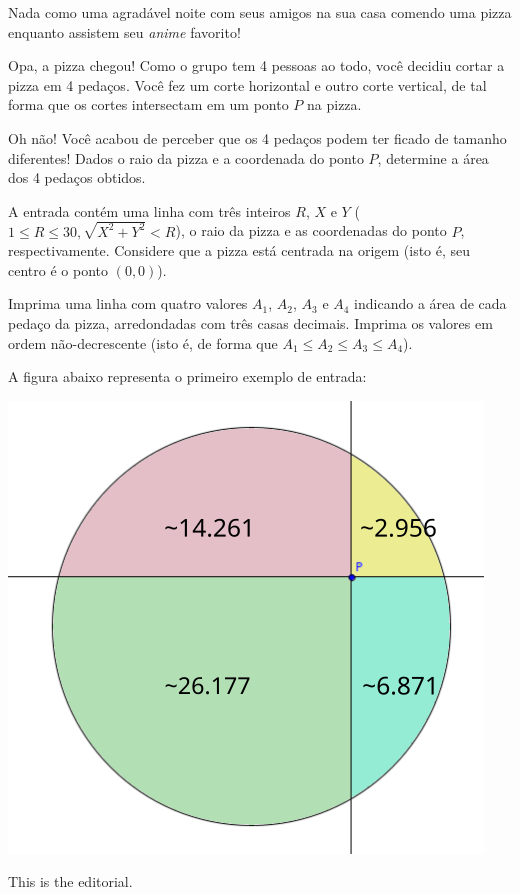 Nada como uma agradável noite com seus amigos na sua casa comendo uma pizza
enquanto assistem seu \textit{anime} favorito!

Opa, a pizza chegou! Como o grupo tem 4 pessoas ao todo, você decidiu cortar a
pizza em 4 pedaços. Você fez um corte horizontal e outro corte vertical, de tal
forma que os cortes intersectam em um ponto $P$ na pizza.

Oh não! Você acabou de perceber que os 4 pedaços podem ter ficado de tamanho
diferentes! Dados o raio da pizza e a coordenada do ponto $P$, determine a área
dos 4 pedaços obtidos.


A entrada contém uma linha com três inteiros $R$, $X$ e $Y$
($1 \leq R \leq 30, \sqrt{X^2 + Y^2} < R$), o raio da pizza e as coordenadas do ponto
$P$, respectivamente. Considere que a pizza está centrada na origem (isto é, seu
centro é o ponto $(0,0)$).


Imprima uma linha com quatro valores $A_1$, $A_2$, $A_3$ e $A_4$ indicando a área de cada
pedaço da pizza, arredondadas com três casas decimais. Imprima os valores em
ordem não-decrescente (isto é, de forma que $A_1 \leq A_2 \leq A_3 \leq A_4$).

A figura abaixo representa o primeiro exemplo de entrada:
\begin{center}
    \includegraphics[scale=1.25]{pizza.png}
\end{center}

This is the editorial.

